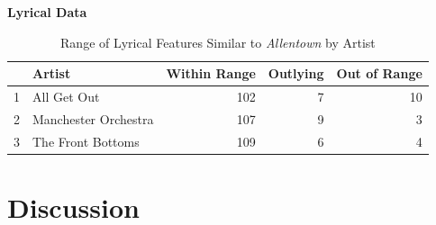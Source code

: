 \documentclass{article}\usepackage[]{graphicx}\usepackage[]{xcolor}
\begin{document}
\begin{multicols}{2}
\begin{table}[H]
\centering
\caption*{\textbf{Lyrical Data}}
\begin{tabular}{rlrrr}
  \hline
 & Artist & Within Range & Outlying & Out of Range \\ 
  \hline
1 & All Get Out & 102 & 7 & 10 \\ 
  2 & Manchester Orchestra & 107 & 9 & 3 \\ 
  3 & The Front Bottoms & 109 & 6 & 4 \\ 
   \hline
\end{tabular}
\caption*{Range of Lyrical Features Similar to \emph{Allentown} by Artist}
\label{LyricalTable}
\end{table}

\twocolumn

\section{Discussion}


\vspace{2em}
\begin{tiny}

\end{tiny}
\end{multicols}
\end{document}
